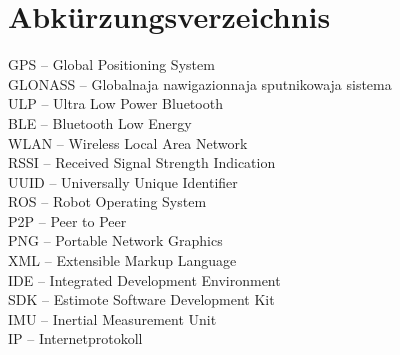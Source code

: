 \chapter*{Abkürzungsverzeichnis}

GPS -- Global Positioning System\\
GLONASS -- Globalnaja nawigazionnaja sputnikowaja sistema\\
ULP -- Ultra Low Power Bluetooth\\
BLE -- Bluetooth Low Energy\\
WLAN -- Wireless Local Area Network\\
RSSI -- Received Signal Strength Indication\\
UUID -- Universally Unique Identifier\\
ROS -- Robot Operating System\\
P2P -- Peer to Peer\\ 
PNG -- Portable Network Graphics\\
XML -- Extensible Markup Language\\
IDE -- Integrated Development Environment\\
SDK -- Estimote Software Development Kit\\
IMU -- Inertial Measurement Unit\\
IP -- Internetprotokoll\\

